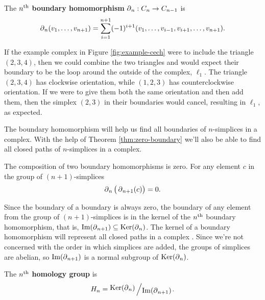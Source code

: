 \begin{definition}\label{def:boundary-homomorphism}
    The \(n\textsuperscript{th}\) \textbf{boundary homomorphism} \(\operatorname{\partial}_n : C_n \to C_{n-1}\) is
    \[
        \operatorname{\partial}_n (v_1,\dots , v_{n+1}) = \sum_{i=1}^{n+1} (-1)^{i+1}
        (v_1,\dots, v_{i-1}, v_{i+1}, \dots, v_{n+1})
        .
    \]
    \cite{hatcher}
\end{definition}

\begin{example}
    If the example complex in Figure \ref{fig:example-cech} were to include the triangle \((2,3,4)\), then we could combine the two triangles and would expect their boundary to be the loop around the outside of the complex, \(\ell_1\).
    The triangle \((2,3,4)\) has clockwise orientation, while \((1,2,3)\) has counterclockwise orientation.
    If we were to give them both the same orientation and then add them, then the simplex \((2,3)\) in their boundaries would cancel, resulting in \(\ell_1\), as expected.
\end{example}

The boundary homomorphism will help us find all boundaries of \(n\)-simplices in a complex.
With the help of Theorem \ref{thm:zero-boundary} we'll also be able to find all closed paths of \(n\)-simplices in a complex.

\begin{theorem}\label{thm:zero-boundary}
    The composition of two boundary homomorphisms is zero.
    For any element \(c\) in the group of \((n+1)\)-simplices
    \begin{align*}
        \operatorname{\partial}_{n} \big( \operatorname{\partial}_{n+1} (c) \big) = 0
        .
    \end{align*}
    \textnormal{\cite{fraleigha}}
\end{theorem}

Since the boundary of a boundary is always zero, the boundary of any element from the group of \((n+1)\)-simplices is in the kernel of the \(n\textsuperscript{th}\) boundary homomorphism, that is, \(\operatorname{Im}(\operatorname{\partial}_{n+1}) \subseteq \operatorname{Ker}(\operatorname{\partial}_n)\).
The kernel of a boundary homomorphism will represent all closed paths in a complex \cite{fraleigha}.
Since we're not concerned with the order in which simplices are added, the groups of simplices are abelian, so \(\operatorname{Im}(\operatorname{\partial}_{n+1})\) is a normal subgroup of \(\operatorname{Ker}(\operatorname{\partial}_{n})  \).

\begin{definition}\label{def:nth-homology-group}
    The \(n\textsuperscript{th}\) \textbf{homology group} is \[H_n = \bigslant{\Ker(\boundary_n)}{\Ima(\boundary_{n+1})}.\]
    \cite{fraleigha}
\end{definition}


